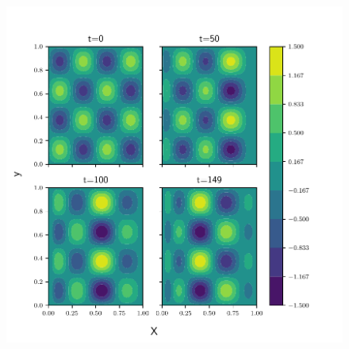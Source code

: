 \begin{figure}[htp]
  \centering
  \includegraphics[width=\textwidth]{../figures/bounded_2d.pdf}
  \caption{}
  \label{fig:2d_bounded}
\end{figure}
